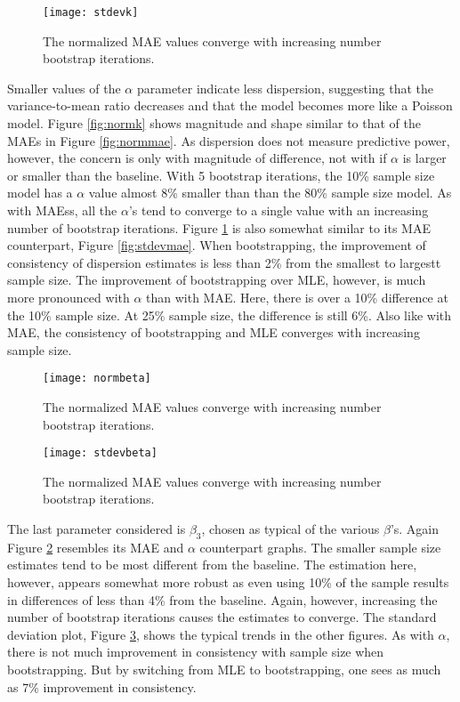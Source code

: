 \documentclass[titlepage,12pt,times,nopageno]{article}
\begin{document}
\begin{figure}[h]
\centering
  \captionnamefont{\bfseries}
  \captiontitlefont{\normalsize \bfseries}
  \captiondelim{ }
  \renewcommand{\figurename}{FIGURE}
\texttt{[image: stdevk]}
	\caption{The normalized MAE values converge with increasing number bootstrap iterations.}
	\label{fig:stdevk}
\end{figure}
Smaller values of the $\alpha$ parameter indicate less dispersion, suggesting that the variance-to-mean ratio decreases and that the model becomes more like a Poisson model.  Figure \ref{fig:normk} shows magnitude and shape similar to that of the MAEs in Figure \ref{fig:normmae}.  As dispersion does not measure predictive power, however, the concern is only with magnitude of difference, not with if $\alpha$ is larger or smaller than the baseline.  With 5 bootstrap iterations, the 10\% sample size model has a $\alpha$ value almost 8\% smaller than than the 80\% sample size model.  As with MAEss, all the $\alpha$'s tend to converge to a single value with an increasing number of bootstrap iterations.  Figure \ref{fig:stdevk} is also somewhat similar to its MAE counterpart, Figure \ref{fig:stdevmae}.  When bootstrapping, the improvement of consistency of dispersion estimates is less than 2\% from the smallest to largestt sample size.  The improvement of bootstrapping over MLE, however, is much more pronounced with $\alpha$ than with MAE.  Here, there is over a 10\% difference at the 10\% sample size.  At 25\% sample size, the difference is still 6\%.  Also like with MAE, the consistency of bootstrapping and MLE converges with increasing sample size.\par
\begin{figure}[h]
\centering
  \captionnamefont{\bfseries}
  \captiontitlefont{\normalsize \bfseries}
  \captiondelim{ }
  \renewcommand{\figurename}{FIGURE}
\texttt{[image: normbeta]}
	\caption{The normalized MAE values converge with increasing number bootstrap iterations.}
	\label{fig:normbeta}
\end{figure}
\begin{figure}[ht]
\centering
  \captionnamefont{\bfseries}
  \captiontitlefont{\normalsize \bfseries}
  \captiondelim{ }
  \renewcommand{\figurename}{FIGURE}
\texttt{[image: stdevbeta]}
	\caption{The normalized MAE values converge with increasing number bootstrap iterations.}
	\label{fig:stdevbeta}
\end{figure}
The last parameter considered is $\beta_3$, chosen as typical of the various $\beta$'s.  Again Figure \ref{fig:normbeta} resembles its MAE and $\alpha$ counterpart graphs.  The smaller sample size estimates tend to be most different from the baseline.  The estimation here, however, appears somewhat more robust as even using 10\% of the sample results in differences of less than 4\% from the baseline.  Again, however, increasing the number of bootstrap iterations causes the estimates to converge.  The standard deviation plot, Figure \ref{fig:stdevbeta}, shows the typical trends in the other figures.  As with $\alpha$, there is not much improvement in consistency with sample size when bootstrapping.  But by switching from MLE to bootstrapping, one sees as much as 7\% improvement in consistency.\par
\end{document}
